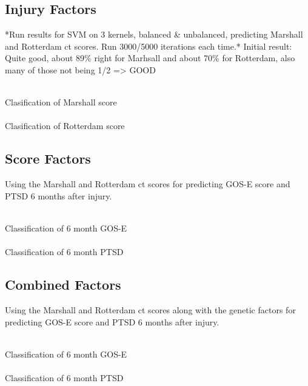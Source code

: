 \documentclass[11pt]{article}
\begin{document}
\subsection{Injury Factors}
*Run results for SVM on 3 kernels, balanced \& unbalanced, predicting Marshall and Rotterdam \gls{ct} scores. Run 3000/5000 iterations each time.*
Initial result: Quite good, about 89\% right for Marhsall and about 70\% for Rotterdam, also many of those not being 1/2 => GOOD\\
\\
\begin{center}
  \Large{Clasification of Marshall score}\\
  \\
  \Large{Clasification of Rotterdam score}\\
\end{center}

\subsection{Score Factors}
Using the Marshall and Rotterdam \gls{ct} scores for predicting GOS-E score and PTSD 6 months after injury.\\
\\
\begin{center}
  \Large{Classification of 6 month GOS-E}\\
  \\
  \Large{Classification of 6 month PTSD}\\
\end{center}

\subsection{Combined Factors}
Using the Marshall and Rotterdam \gls{ct} scores along with the genetic factors for predicting GOS-E score and PTSD 6 months after injury.\\
\\
\begin{center}
  \Large{Classification of 6 month GOS-E}\\
  \\
  \Large{Classification of 6 month PTSD}\\
\end{center}
\end{document}
